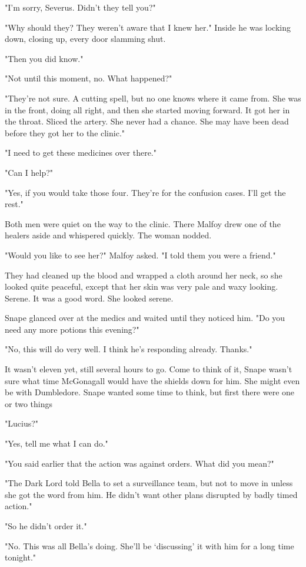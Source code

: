 "I'm sorry, Severus. Didn't they tell you?"

"Why should they? They weren't aware that I knew her." Inside he was locking down, closing up, every door slamming shut.

"Then you did know."

"Not until this moment, no. What happened?"

"They're not sure. A cutting spell, but no one knows where it came from. She was in the front, doing all right, and then she started moving forward. It got her in the throat. Sliced the artery. She never had a chance. She may have been dead before they got her to the clinic."

"I need to get these medicines over there."

"Can I help?"

"Yes, if you would take those four. They're for the confusion cases. I'll get the rest."

Both men were quiet on the way to the clinic. There Malfoy drew one of the healers aside and whispered quickly. The woman nodded.

"Would you like to see her?" Malfoy asked. "I told them you were a friend."

They had cleaned up the blood and wrapped a cloth around her neck, so she looked quite peaceful, except that her skin was very pale and waxy looking. Serene. It was a good word. She looked serene.

Snape glanced over at the medics and waited until they noticed him. "Do you need any more potions this evening?"

"No, this will do very well. I think he's responding already. Thanks."

It wasn't eleven yet, still several hours to go. Come to think of it, Snape wasn't sure what time McGonagall would have the shields down for him. She might even be with Dumbledore. Snape wanted some time to think, but first there were one or two things{\el}

"Lucius?"

"Yes, tell me what I can do."

"You said earlier that the action was against orders. What did you mean?"

"The Dark Lord told Bella to set a surveillance team, but not to move in unless she got the word from him. He didn't want other plans disrupted by badly timed action."

"So he didn't order it."

"No. This was all Bella's doing. She'll be `discussing' it with him for a long time tonight."

